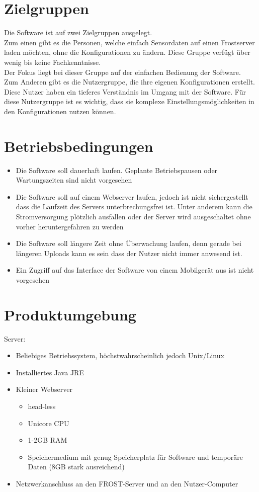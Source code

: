 \documentclass[a4paper, 12 pt]{article}
\begin{document}
	
	\section{Zielgruppen}
	Die Software ist auf zwei Zielgruppen ausgelegt.\\
	Zum einen gibt es die Personen, welche einfach Sensordaten auf einen Frostserver laden möchten, ohne die Konfigurationen zu ändern. Diese Gruppe verfügt über wenig bis keine Fachkenntnisse. \\Der Fokus liegt bei dieser Gruppe auf der einfachen Bedienung der Software.\\
	Zum Anderen gibt es die Nutzergruppe, die ihre eigenen Konfigurationen erstellt. Diese Nutzer haben ein tieferes Verständnis im Umgang mit der Software. Für diese Nutzergruppe ist es wichtig, dass sie komplexe Einstellungsmöglichkeiten in den Konfigurationen nutzen können.
	
	\newpage
\section{Betriebsbedingungen}
\begin{itemize}
	\item Die Software soll dauerhaft laufen. Geplante Betriebspausen oder Wartungszeiten sind nicht vorgesehen
	\item Die Software soll auf einem Webserver laufen, jedoch ist nicht sichergestellt dass die Laufzeit des Servers unterbrechungsfrei ist. Unter anderem kann die Stromversorgung plötzlich ausfallen oder der Server wird ausgeschaltet ohne vorher heruntergefahren zu werden
	\item Die Software soll längere Zeit ohne Überwachung laufen, denn gerade bei längeren Uploads kann es sein dass der Nutzer nicht immer anwesend ist.
	\item Ein Zugriff auf das Interface der Software von einem Mobilgerät aus ist nicht vorgesehen
\end{itemize}
	
\section{Produktumgebung}
Server:
\begin{itemize}
	\item Beliebiges Betriebssystem, höchstwahrscheinlich jedoch Unix/Linux
	\item Installiertes Java JRE
	\item Kleiner Webserver
	\begin{itemize}
		\item head-less
		\item Unicore CPU
		\item 1-2GB RAM
		\item Speichermedium mit genug Speicherplatz für Software und temporäre Daten (8GB stark ausreichend)
	\end{itemize}
	\item Netzwerkanschluss an den FROST-Server und an den Nutzer-Computer
\end{itemize}
\end{document}
